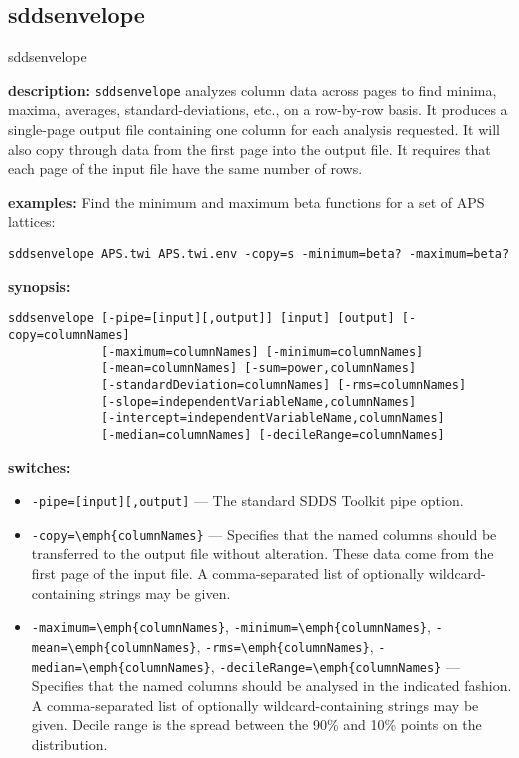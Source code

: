 \newpage
\subsection{sddsenvelope}
\label{sddsenvelope}

\begin{sddsprog}{sddsenvelope}
  \item \textbf{description:} {\tt sddsenvelope} analyzes column data across pages to find minima, maxima, averages, standard-deviations, etc., on a row-by-row basis. It produces a single-page output file containing one column for each analysis requested. It will also copy through data from the first page into the output file. It requires that each page of the input file have the same number of rows.
  \item \textbf{examples:} Find the minimum and maximum beta functions for a set of APS lattices:
  \begin{verbatim}
sddsenvelope APS.twi APS.twi.env -copy=s -minimum=beta? -maximum=beta?
  \end{verbatim}
  \item \textbf{synopsis:}
  \begin{verbatim}
sddsenvelope [-pipe=[input][,output]] [input] [output] [-copy=columnNames]
             [-maximum=columnNames] [-minimum=columnNames]
             [-mean=columnNames] [-sum=power,columnNames]
             [-standardDeviation=columnNames] [-rms=columnNames]
             [-slope=independentVariableName,columnNames]
             [-intercept=independentVariableName,columnNames]
             [-median=columnNames] [-decileRange=columnNames]
  \end{verbatim}
  \item \textbf{switches:}
  \begin{itemize}
    \item \verb|-pipe=[input][,output]| --- The standard SDDS Toolkit pipe option.
    \item \verb|-copy=\emph{columnNames}| --- Specifies that the named columns should be transferred to the output file without alteration. These data come from the first page of the input file. A comma-separated list of optionally wildcard-containing strings may be given.
    \item \verb|-maximum=\emph{columnNames}|, \verb|-minimum=\emph{columnNames}|, \verb|-mean=\emph{columnNames}|, \verb|-rms=\emph{columnNames}|, \verb|-median=\emph{columnNames}|, \verb|-decileRange=\emph{columnNames}| --- Specifies that the named columns should be analysed in the indicated fashion. A comma-separated list of optionally wildcard-containing strings may be given. Decile range is the spread between the 90\% and 10\% points on the distribution.

\end{itemize}
\end{sddsprog}
